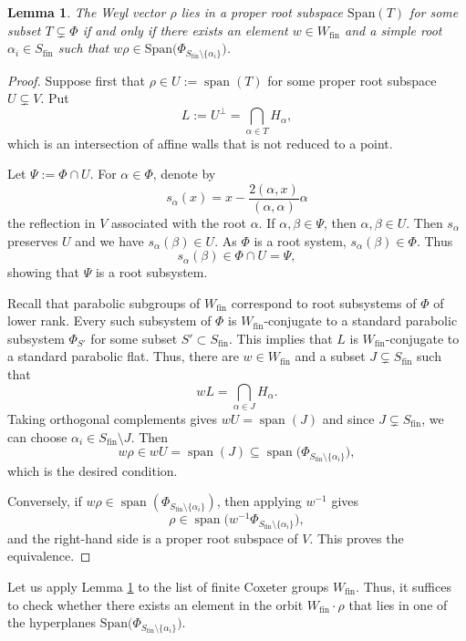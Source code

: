 \documentclass[11pt]{amsart}
\DeclareMathOperator{\Span}{span}
\theoremstyle{plain}
\newtheorem{lem}[thm]{Lemma}
\theoremstyle{definition}
\theoremstyle{remark}
\begin{document}
	\begin{lem} \label{lem:reduction}
		The Weyl vector \( \rho \) lies in a proper root subspace \( \mathrm{Span}(T) \) for some subset \( T \subsetneq \Phi \) if and only if there exists an element \( w \in W_{\mathrm{fin}}  \) and a simple root \( \alpha_i \in S_{\mathrm{fin}}  \) such that $w\rho \in \mathrm{Span}\bigl(\Phi_{S_{\mathrm{fin}}  \setminus \{\alpha_i\}}\bigr)$.
	\end{lem}
	\begin{proof}
		Suppose first that \(\rho\in U:=\Span(T)\) for some proper root subspace \(U\subsetneq V\).  Put
		\[
		L:=U^\perp=\bigcap_{\alpha\in T}H_\alpha, 
		\]
		which is an intersection of affine walls that is not reduced to a point. 

Let $\Psi:=\Phi\cap U$. For $\alpha\in\Phi$, denote by \[ s_\alpha(x)=x-\frac{2(\alpha,x)}{(\alpha,\alpha)}\alpha \] the reflection in $V$ associated with the root $\alpha$. If $\alpha,\beta\in\Psi$, then $\alpha,\beta\in U$. Then $s_\alpha$ preserves $U$ and we have \(s_\alpha(\beta)\in U\). As $\Phi$ is a root system, $s_\alpha(\beta)\in\Phi$. Thus \[ s_\alpha(\beta)\in\Phi\cap U=\Psi, \] showing that $\Psi$ is a root subsystem. 

Recall that parabolic subgroups of $W_{\mathrm{fin}}$ correspond to root subsystems of $\Phi$ of lower rank. Every such subsystem of \( \Phi \) is \( W_{\mathrm{fin}} \)-conjugate to a standard parabolic subsystem \( \Phi_{S'} \) for some subset \( S' \subset S_{\mathrm{fin}}  \). This implies that $L  $ is \(W_{\mathrm{fin}}\)-conjugate to a standard parabolic flat. Thus, there are \(w\in W_{\mathrm{fin}}\) and a subset \(J\subsetneq S_{\mathrm{fin}}\) such that
		\[
		wL=\bigcap_{\alpha\in J}H_\alpha .
		\]
		Taking orthogonal complements gives $ wU=\Span(J)$ and since \(J\subsetneq S_{\mathrm{fin}}\), we can choose \(\alpha_i\in S_{\mathrm{fin}}\setminus J\).  Then
		\[
		w\rho\in wU=\Span(J)
		\subseteq \Span\bigl(\Phi_{S_{\mathrm{fin}}\setminus\{\alpha_i\}}\bigr),
		\]
		which is the desired condition.
		
		Conversely, if \(w\rho\in\Span(\Phi_{S_{\mathrm{fin}}\setminus\{\alpha_i\}})\), then applying \(w^{-1}\) gives
		\[
		\rho\in \Span\bigl(w^{-1}\Phi_{S_{\mathrm{fin}}\setminus\{\alpha_i\}}\bigr),
		\]
		and the right-hand side is a proper root subspace of \(V\).  This proves the equivalence.
	\end{proof}
	
	Let us apply Lemma \ref{lem:reduction} to the list of finite Coxeter groups \( W_{\mathrm{fin}} \). Thus, it suffices to check whether there exists an element in the orbit \( W_{\mathrm{fin}} \cdot \rho \) that lies in one of the hyperplanes \( \mathrm{Span}\bigl(\Phi_{S_{\mathrm{fin}} \setminus \{\alpha_i\}}\bigr) \).	  
	
\end{document}
